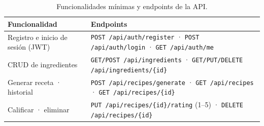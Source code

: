 \documentclass[10pt,a4paper]{article}
\newcommand{\code}[1]{\texttt{\small #1}}
\begin{document}
\begin{table}[h]
\centering\small
\begin{tabularx}{\linewidth}{@{}l X@{}}
\toprule
\textbf{Funcionalidad} & \textbf{Endpoints}\\
\midrule
Registro e inicio de sesión (JWT) & \code{POST /api/auth/register} · \code{POST /api/auth/login} · \code{GET /api/auth/me}\\
CRUD de ingredientes & \code{GET/POST /api/ingredients} · \code{GET/PUT/DELETE /api/ingredients/\{id\}}\\
Generar receta · historial & \code{POST /api/recipes/generate} · \code{GET /api/recipes} · \code{GET /api/recipes/\{id\}}\\
Calificar · eliminar & \code{PUT /api/recipes/\{id\}/rating} (1–5) · \code{DELETE /api/recipes/\{id\}}\\
\bottomrule
\end{tabularx}
\caption{Funcionalidades mínimas y endpoints de la API.}
\end{table}

\newpage
\end{document}
